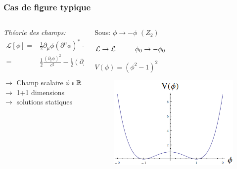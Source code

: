 \documentclass[handout]{beamer}
\begin{document}
\begin{frame}\frametitle{Cas de figure typique}
\begin{columns}[T]
    \begin{column}[T]{.5\linewidth}
     \textit{Théorie des champs:}
    \begin{align*}
\mathcal{L}[\phi] =& \frac{1}{2} \partial_\mu \phi (\partial^\mu \phi)^* -V(\phi)\\
=& \frac{1}{2} \frac{(\partial_t\phi)^2}{c^2}  - \frac{1}{2} (\partial_x\phi)^2  -V  
\end{align*} \\[0.5 cm]
$\rightarrow$ Champ scalaire $\phi \hspace{1mm} \epsilon \hspace{1mm} \mathbb{R}$
    \\$\rightarrow$ 1+1 dimensions
  \\$\rightarrow$ solutions statiques \\[0.25 cm]
   
   

\end{column}
    \begin{column}[T]{.5\linewidth}
     \begin{exampleblock}{Sous: $\phi \rightarrow -\phi$ $(Z_2)$}
    \begin{center}
   $ \mathcal{L} \rightarrow \mathcal{L} \hspace{1 cm}\phi_0 \rightarrow -\phi_0$ \\
    \end{center}    
    \end{exampleblock}
    \begin{block}{}
    \begin{center}
      $V(\phi) =(\phi^2 -1)^2$
\end{center}      
      \end{block}
    \begin{figure}
     \includegraphics[scale=0.35]{pot_z2.png}
    \end{figure}
    \end{column}
\end{columns}
\end{frame}
\end{document}
